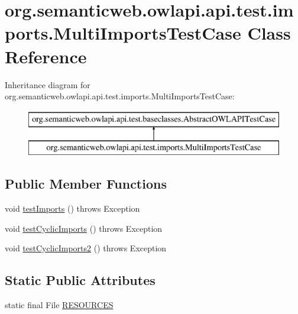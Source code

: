 \hypertarget{classorg_1_1semanticweb_1_1owlapi_1_1api_1_1test_1_1imports_1_1_multi_imports_test_case}{\section{org.\-semanticweb.\-owlapi.\-api.\-test.\-imports.\-Multi\-Imports\-Test\-Case Class Reference}
\label{classorg_1_1semanticweb_1_1owlapi_1_1api_1_1test_1_1imports_1_1_multi_imports_test_case}
}
Inheritance diagram for org.\-semanticweb.\-owlapi.\-api.\-test.\-imports.\-Multi\-Imports\-Test\-Case\-:\begin{figure}[H]
\begin{center}
\leavevmode
\includegraphics[height=2.000000cm]{classorg_1_1semanticweb_1_1owlapi_1_1api_1_1test_1_1imports_1_1_multi_imports_test_case}
\end{center}
\end{figure}
\subsection*{Public Member Functions}
\begin{DoxyCompactItemize}
\item 
void \hyperlink{classorg_1_1semanticweb_1_1owlapi_1_1api_1_1test_1_1imports_1_1_multi_imports_test_case_ad8edc79facc4d3c60700a46cf1c3df01}{test\-Imports} ()  throws Exception 
\item 
void \hyperlink{classorg_1_1semanticweb_1_1owlapi_1_1api_1_1test_1_1imports_1_1_multi_imports_test_case_ab8cf261603d7f13e7c001ebcad3f957a}{test\-Cyclic\-Imports} ()  throws Exception 
\item 
void \hyperlink{classorg_1_1semanticweb_1_1owlapi_1_1api_1_1test_1_1imports_1_1_multi_imports_test_case_a0ea9a82814a331a51e6f2bceda4c0f2d}{test\-Cyclic\-Imports2} ()  throws Exception 
\end{DoxyCompactItemize}
\subsection*{Static Public Attributes}
\begin{DoxyCompactItemize}
\item 
static final File \hyperlink{classorg_1_1semanticweb_1_1owlapi_1_1api_1_1test_1_1imports_1_1_multi_imports_test_case_a4bdad96e05c032ca42352618bb4753b1}{R\-E\-S\-O\-U\-R\-C\-E\-S}
\end{DoxyCompactItemize}
